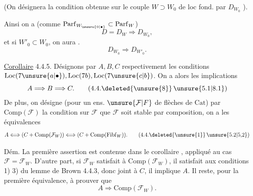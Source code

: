 
(On désignera la condition obtenue sur le couple $W\supset W_0$ de loc fond. par  $D_{W_0}$ ).

Ainsi on a (comme $\mathrm{Parf}_{W_{\unsure{0|\bullet}}}\subset\mathrm{Parf}_{W}$)
\[
 D=D_W\Longrightarrow D_{W_0}, \tag*{(4.4.4)}
\]
et si $W'_0\subset W_0$, on aura .
\[
 D_{W_0}\Longrightarrow D_{W'_0}. \tag*{(4.4.5)}
\]

\uline{Corollaire} 4.4.5. Désignons par $A,B,C$ respectivement les conditions $\mathrm{Loc}(7\unsure{a|\bullet}),\mathrm{Loc}(7b),\mathrm{Loc}(7\unsure{c|b})$. On a alors les implications
\[
 A\Longrightarrow B\Longrightarrow C. \tag*{(4.4.\deleted{\unsure{8}}\,\unsure{5.1|8.1})}
\]
De plus,  on désigne (pour un ens. $\unsure{\mathcal{F}|F}$ de flèches de $\mathrm{Cat}$) par $\mathrm{Comp}(\mathcal{F})$ la condition sur $\mathcal{F}$ que $\mathcal{F}$ soit stable par composition, on a les équivalences
\[
 A\Longleftrightarrow(C+\mathrm{Comp}(\mathcal{F}_{W}))
 \Longleftrightarrow(C+\mathrm{Comp}(\mathrm{Fibf}_{W})). \tag*{(4.4.\deleted{\unsure{1}}\,\unsure{5.2|5,2})}
\]

Dém. La première assertion est contenue dans le corollaire , appliqué au cas $\mathcal{F}=\mathcal{F}_{W}$. D'autre part, si $\mathcal{F}_{W}$ satisfait à $\mathrm{Comp}(\mathcal{F}_{W})$, il satisfait aux conditions 1)  3) du lemme de Brown 4.4.3, donc joint à $C$, il implique $A$.  Il reste, pour la première équivalence, à prouver que
\[
 A\Longrightarrow\mathrm{Comp}(\mathcal{F}_{W}).
\]
